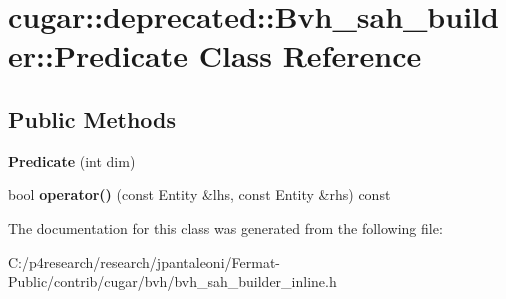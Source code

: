 \hypertarget{classcugar_1_1deprecated_1_1_bvh__sah__builder_1_1_predicate}{}\section{cugar\+:\+:deprecated\+:\+:Bvh\+\_\+sah\+\_\+builder\+:\+:Predicate Class Reference}
\label{classcugar_1_1deprecated_1_1_bvh__sah__builder_1_1_predicate}
\subsection*{Public Methods}
\begin{DoxyCompactItemize}
\item 
\mbox{\label{classcugar_1_1deprecated_1_1_bvh__sah__builder_1_1_predicate_a8552e11d4cc5502031689a8fe3cceaaa}} 
{\bfseries Predicate} (int dim)
\item 
\mbox{\label{classcugar_1_1deprecated_1_1_bvh__sah__builder_1_1_predicate_a8e000c5fa9c672911d765c884c5e61b8}} 
bool {\bfseries operator()} (const Entity \&lhs, const Entity \&rhs) const
\end{DoxyCompactItemize}


The documentation for this class was generated from the following file\+:\begin{DoxyCompactItemize}
\item 
C\+:/p4research/research/jpantaleoni/\+Fermat-\/\+Public/contrib/cugar/bvh/bvh\+\_\+sah\+\_\+builder\+\_\+inline.\+h\end{DoxyCompactItemize}
